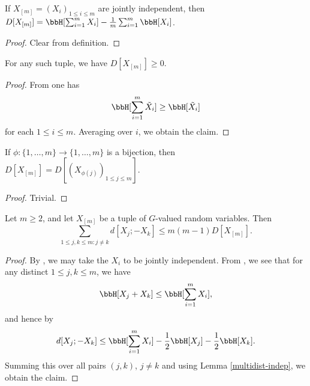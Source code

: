 \begin{lemma}\label{multidist-indep}\leanok  If $X_{[m]} = (X_i)_{1 \leq i \leq m}$ are jointly independent, then $D[X_{[m]}] = \bbH[\sum_{i=1}^m X_i] - \frac{1}{m} \sum_{i=1}^m \bbH[X_i]$.
\end{lemma}

\begin{proof}\leanok  Clear from definition.
\end{proof}

\begin{lemma}[Nonnegativity]\label{multidist-nonneg}\leanok  For any such tuple, we have $D[X_{[m]}] \geq 0$.
\end{lemma}

\begin{proof}\leanok  From  one has
$$ \bbH[\sum_{i =1}^m \tilde X_i] \geq \bbH[\tilde X_i]$$
for each $1 \leq i \leq m$.  Averaging over $i$, we obtain the claim.
\end{proof}

\begin{lemma}[Relabeling]\label{multidist-perm}\leanok If $\phi: \{1,\dots,m\} \to \{1,\dots,m\}$ is a bijection, then $D[X_{[m]}] = D[(X_{\phi(j)})_{1 \leq j \leq m}]$.
\end{lemma}

\begin{proof}\leanok Trivial.
\end{proof}

\begin{lemma}\label{multidist-ruzsa-I}\leanok
  Let $m \ge 2$, and let $X_{[m]}$ be a tuple of $G$-valued random variables. Then
  $$\sum_{1 \leq j,k \leq m: j \neq k} d[X_j; -X_k] \leq m(m-1) D[X_{[m]}].$$
\end{lemma}

\begin{proof}\leanok
By ,  we may take the $X_i$ to be jointly independent.  From , we see that for any distinct $1 \leq j,k \leq m$, we have
  \[
    \bbH[X_j+X_k] \leq \bbH[\sum_{i=1}^m X_i],
  \]
  and hence by 
  \[
    d[X_j;-X_k] \leq \bbH[\sum_{i=1}^m X_i] - \frac{1}{2} \bbH[X_j] - \frac{1}{2} \bbH[X_k].
  \]
  Summing this over all pairs $(j,k)$, $j \neq k$ and using Lemma \ref{multidist-indep}, we obtain the claim.
\end{proof}

